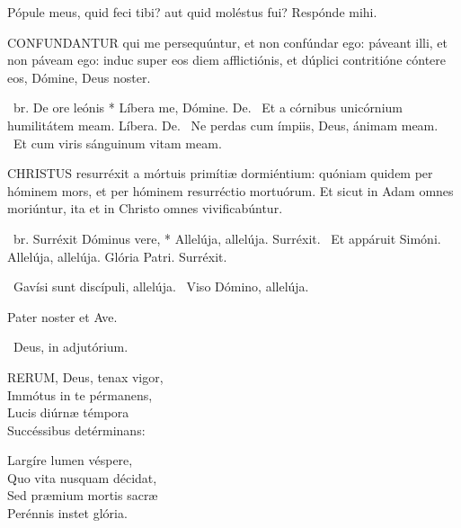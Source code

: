 


 Pópule meus, quid feci tibi? aut quid moléstus fui? Respónde mihi.


\lettrine[lines=2]{C}{ONFUNDANTUR} qui me persequúntur, et non confúndar ego: páveant illi, et non páveam ego: induc super eos diem afflictiónis, et dúplici contritióne cóntere eos, Dómine, Deus noster.

\R\ br. De ore leónis * Líbera me, Dómine. De. \V\ Et a córnibus unicórnium humilitátem meam. Líbera. De. \V\ Ne perdas cum ímpiis, Deus, ánimam meam. \R\ Et cum viris sánguinum vitam meam.




\lettrine[lines=2]{C}{HRISTUS} resurréxit a mórtuis primítiæ dormiéntium: quóniam quidem per hóminem mors, et per hóminem resurréctio mortuórum. Et sicut in Adam omnes moriúntur, ita et in Christo omnes vivificabúntur.

\R\ br. Surréxit Dóminus vere, * Allelúja, allelúja. Surréxit. \V\ Et appáruit Simóni. Allelúja, allelúja. Glória Patri. Surréxit.

\V\ Gavísi sunt discípuli, allelúja. \R\ Viso Dómino, allelúja.


\sectionornament


Pater noster et Ave.

\V\ Deus, in adjutórium.


\lettrine[lines=2]{R}{ERUM}, Deus, tenax vigor,\\
Immótus in te pérmanens,\\
Lucis diúrnæ témpora\\
Succéssibus detérminans:

Largíre lumen véspere,\\
Quo vita nusquam décidat,\\
Sed præmium mortis sacræ\\
Perénnis instet glória.

